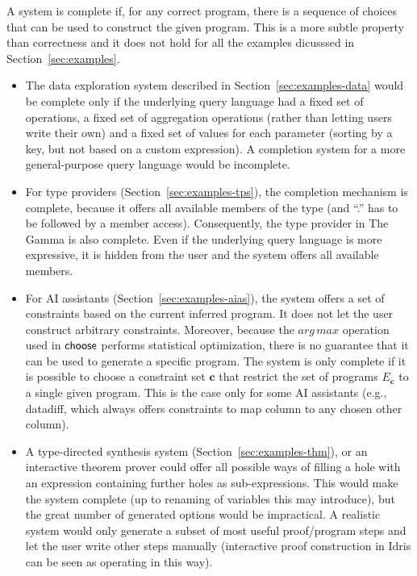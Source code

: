 \documentclass[a4paper,UKenglish,cleveref, autoref, thm-restate]{lipics-v2021}
\newcommand{\ident}[1]{\textsf{#1}}
\newcommand{\select}{\textnormal{\ident{choose}}}
\begin{document}
A system is complete if, for any correct program, there is a sequence of choices that can be
used to construct the given program. This is a more subtle property than correctness and
it does not hold for all the examples dicusssed in Section~\ref{sec:examples}.

\begin{itemize}
\setlength{\itemsep}{5pt}
\item The data exploration system described in Section~\ref{sec:examples-data} would be complete
  only if the underlying query language had a fixed set of operations, a fixed set of aggregation
  operations (rather than letting users write their own) and a fixed set of values for each
  parameter (sorting by a key, but not based on a custom expression). A completion system for a
  more general-purpose query language would be incomplete.

\item For type providers (Section~\ref{sec:examples-tps}), the completion mechanism is complete,
  because it offers all available members of the type (and ``.'' has to be followed by a member
  access). Consequently, the type provider in The Gamma is also complete. Even if the underlying
  query language is more expressive, it is hidden from the user and the system offers all
  available members.

\item For AI assistants (Section~\ref{sec:examples-aias}), the system offers a set of constraints
  based on the current inferred program. It does not let the user construct arbitrary constraints.
  Moreover, because the $\mathit{arg\,max}$ operation used in $\select$ performs statistical
  optimization, there is no guarantee that it can be used to generate a specific program.
  The system is only complete if it is possible to choose a constraint set $\boldsymbol{c}$ that
  restrict the set of programs $E_{\boldsymbol{c}}$ to a single given program. This is the case
  only for some AI assistants (e.g., datadiff, which always offers constraints to map column to
  any chosen other column).

\item A type-directed synthesis system (Section~\ref{sec:examples-thm}), or an interactive theorem
  prover could offer all possible ways of filling a hole with an expression containing further
  holes as sub-expressions. This would make the system complete (up to renaming of variables this
  may introduce), but the great number of generated options would be impractical. A realistic
  system would only generate a subset of most useful proof/program steps and let the user write
  other steps manually (interactive proof construction in Idris can be seen as operating in this way).
\end{itemize}
\end{document}
